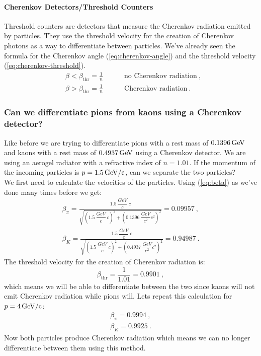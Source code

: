 \documentclass[10pt, titlepage, a4paper]{article}
\numberwithin{equation}{section}
\begin{document}
\paragraph{Cherenkov Detectors/Threshold Counters}
Threshold counters are detectors that measure the Cherenkov radiation emitted by particles. They use the threshold velocity 
for the creation of Cherenkov photons as a way to differentiate between particles. We've already seen the formula for the Cherenkov
angle (\ref{eq:cherenkov-angle}) and the threshold velocity (\ref{eq:cherenkov-threshold}).
%
\begin{align*}
    &\beta < \beta_{\text{thr}} = \frac{1}{n}\qquad\quad \text{no Cherenkov radiation}\>, \\
    &\beta > \beta_{\text{thr}} = \frac{1}{n}\qquad\quad \text{Cherenkov radiation}\>.   
\end{align*}
%

\subsubsection{Can we differentiate pions from kaons using a Cherenkov detector?}
Like before we are trying to differentiate pions with a rest mass of $0.1396\,\rm{GeV}$ and kaons with a rest mass 
of $0.4937\,\rm{GeV}$ using a Cherenkov detector. We are using an aerogel radiator with a refractive index of $n=1.01$. If the momentum of 
the incoming particles is $p=1.5\,\rm{GeV/c}$, can we separate the two particles? \\

We first need to calculate the velocities of the particles. Using (\ref{eq:beta}) as we've done many times before we get:
%
\begin{align*}
    \beta_\pi = \frac{1.5\>\dfrac{GeV}{c}\>c}{\sqrt{\left(1.5\>\dfrac{GeV}{c}\>c\right)^2 + \left(0.1396\>\dfrac{GeV}{c^2}c^2\right)^2}}  = 0.09957\>, \\
    \beta_K = \frac{1.5\>\dfrac{GeV}{c}\>c}{\sqrt{\left(1.5\>\dfrac{GeV}{c}\>c\right)^2 + \left(0.4937\>\dfrac{GeV}{c^2}c^2\right)^2}} = 0.94987\>.
\end{align*}
%
The threshold velocity for the creation of Cherenkov radiation is:
%
\begin{equation}
    \beta_{\text{thr}} = \frac{1}{1.01} = 0.9901\>,
\end{equation}
%
which means we will be able to differentiate between the two since kaons will not emit Cherenkov radiation while pions will. Lets repeat this 
calculation for $p=4\,\rm{GeV/c}$:
%
\begin{align*}
    \beta_\pi = 0.9994\>, \\
    \beta_K = 0.9925\>.
\end{align*}
%
Now both particles produce Cherenkov radiation which means we can no longer differentiate between them using this method.



% 
% 

\end{document}
